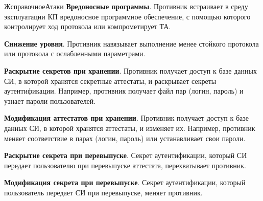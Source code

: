 \begin{appendix}{Ж}{справочное}{Атаки}
{\bf Вредоносные программы}. 
Противник встраивает в среду эксплуатации КП вредоносное 
программное обеспечение, с помощью которого контролирует
ход протокола или компрометирует ТА.


{\bf Снижение уровня}. 
Противник навязывает выполнение менее стойкого протокола
или протокола с ослабленными параметрами.


\label{ATK.CM}

{\bf Раскрытие секретов при хранении}.
Противник получает доступ к базе данных СИ, в которой хранятся 
секретные аттестаты, и раскрывает секреты аутентификации. 
%
Например, противник получает файл пар (логин, пароль) и узнает пароли 
пользователей. 


{\bf Модификация аттестатов при хранении}.
Противник получает доступ к базе данных СИ, в которой хранятся аттестаты,
и изменяет их. 
%
Например, противник меняет соответствие в парах (логин, пароль)
или устанавливает свои пароли.


{\bf Раскрытие секрета при перевыпуске}. 
Секрет аутентификации, который СИ передает пользователю при перевыпуске
аттестата, перехватывает противник.


{\bf Модификация секрета при перевыпуске}. 
Секрет аутентификации, который пользователь передает СИ при перевыпуске, 
меняет противник.  


\end{appendix}
